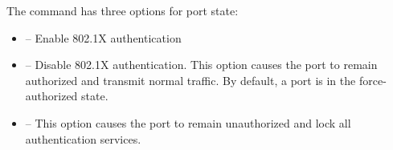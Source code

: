 The  command has three options for port state:

\begin{itemize}
\item {} -- Enable 802.1X authentication
\item {} -- Disable 802.1X authentication. This option causes the port to remain authorized and transmit normal traffic. By default, a port is in the force-authorized state.
\item {} -- This option causes the port to remain unauthorized and lock all authentication services.
\end{itemize}